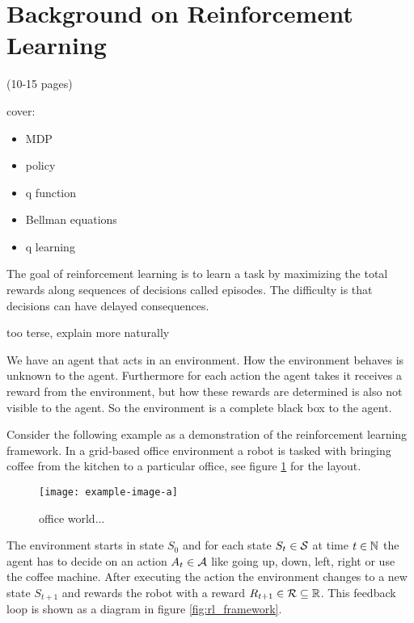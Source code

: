 \section{Background on Reinforcement Learning}

\begin{notes}
    (10-15 pages)

    cover:
    \begin{itemize}
        \item MDP
        \item policy
        \item q function
        \item Bellman equations
        \item q learning
    \end{itemize}
\end{notes}

The goal of reinforcement learning is to learn a task by maximizing the total rewards along sequences of decisions called episodes. The difficulty is that decisions can have delayed consequences.
\begin{notes}
    too terse, explain more naturally
\end{notes}

We have an agent that acts in an environment. How the environment behaves is unknown to the agent. Furthermore for each action the agent takes it receives a reward from the environment, but how these rewards are determined is also not visible to the agent. So the environment is a complete black box to the agent.

Consider the following example as a demonstration of the reinforcement learning framework. In a grid-based office environment a robot is tasked with bringing coffee from the kitchen to a particular office, see figure \ref{fig:officegrid} for the layout.

\begin{figure}[h]
    \centering
    \texttt{[image: example-image-a]}
    \caption{office world...}
    \label{fig:officegrid}
\end{figure}

The environment starts in state $S_0$ and for each state $S_t \in \S$ at time $t \in \N$ the agent has to decide on an action $A_t \in \A$ like going up, down, left, right or use the coffee machine. After executing the action the environment changes to a new state $S_{t+1}$ and rewards the robot with a reward $R_{t+1} \in \calR \subseteq \R$. This feedback loop is shown as a diagram in figure \ref{fig:rl_framework}.

